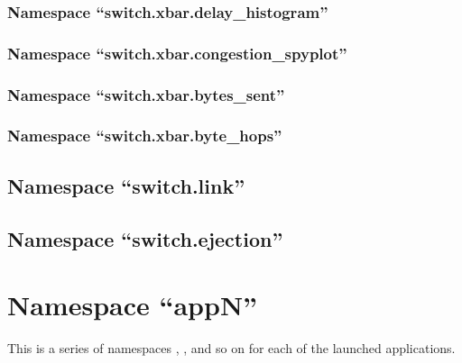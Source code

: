 \subsubsection{Namespace ``switch.xbar.delay\_histogram''}

\subsubsection{Namespace ``switch.xbar.congestion\_spyplot''}

\subsubsection{Namespace ``switch.xbar.bytes\_sent''}

\subsubsection{Namespace ``switch.xbar.byte\_hops''}

\subsection{Namespace ``switch.link''}

\subsection{Namespace ``switch.ejection''}


\section{Namespace ``appN''}
This is a series of namespaces , , and so on for each of the launched applications.

